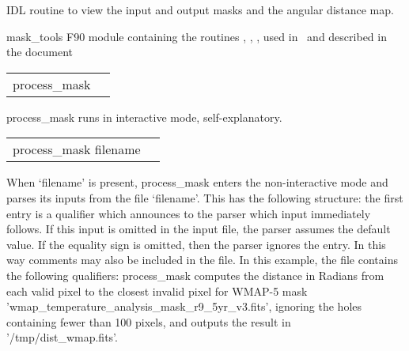 \begin{support}
  \begin{sulist}{} %
  \item[\htmlref{mollview}{idl:mollview}] IDL routine to view the input and output masks and the angular
distance map.
  \item[mask\_tools] F90 module containing the routines   
	,
	,
	,
used in \thedocid\ and
described in the  document
  \end{sulist}
\end{support}

\begin{examples}{1}
{
\begin{tabular}{ll} %
process\_mask  \\
\end{tabular}
}
{
process\_mask runs in interactive mode, self-explanatory.
}
\end{examples}


\begin{examples}{2}
{
\begin{tabular}{ll} %
process\_mask  filename \\
\end{tabular}
}
{When `filename' is present, process\_mask enters the non-interactive mode and parses
its inputs from the file `filename'. This has the following
structure: the first entry is a qualifier which announces to the parser
which input immediately follows. If this input is omitted in the
input file, the parser assumes the default value.
If the equality sign is omitted, then the parser ignores the entry.
In this way comments may also be included in the file.
In this example, the file contains the following qualifiers:\hfill\newline
{}
process\_mask computes the distance in Radians from each valid pixel to the closest invalid
pixel for WMAP-5 mask 'wmap\_temperature\_analysis\_mask\_r9\_5yr\_v3.fits', ignoring
the holes containing fewer than 100 pixels, and outputs the result in '/tmp/dist\_wmap.fits'.}
\end{examples}

